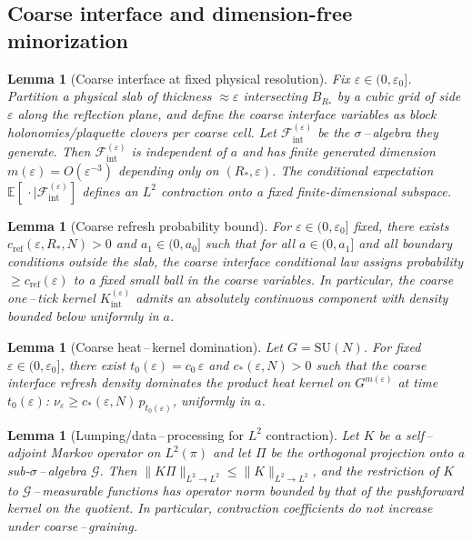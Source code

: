 \documentclass[11pt]{amsart}
\theoremstyle{plain}
\newtheorem{lemma}[theorem]{Lemma}
\theoremstyle{definition}
\theoremstyle{remark}
\begin{document}
\subsection*{Coarse interface and dimension-free minorization}

\begin{lemma}[Coarse interface at fixed physical resolution]\label{lem:coarse-interface-construction}
Fix $\varepsilon\in(0,\varepsilon_0]$. Partition a physical slab of thickness $\approx \varepsilon$ intersecting $B_{R_*}$ by a cubic grid of side $\varepsilon$ along the reflection plane, and define the coarse interface variables as block holonomies/plaquette clovers per coarse cell. Let $\mathcal F_{\mathrm{int}}^{(\varepsilon)}$ be the $\sigma$\,–\,algebra they generate. Then $\mathcal F_{\mathrm{int}}^{(\varepsilon)}$ is independent of $a$ and has finite generated dimension $m(\varepsilon)=O(\varepsilon^{-3})$ depending only on $(R_*,\varepsilon)$. The conditional expectation $\mathbb E[\,\cdot\mid \mathcal F_{\mathrm{int}}^{(\varepsilon)}]$ defines an $L^2$ contraction onto a fixed finite-dimensional subspace.
\end{lemma}

\begin{lemma}[Coarse refresh probability bound]\label{lem:coarse-refresh}
For $\varepsilon\in(0,\varepsilon_0]$ fixed, there exists $c_{\mathrm{ref}}(\varepsilon,R_*,N)>0$ and $a_1\in(0,a_0]$ such that for all $a\in(0,a_1]$ and all boundary conditions outside the slab, the coarse interface conditional law assigns probability $\ge c_{\mathrm{ref}}(\varepsilon)$ to a fixed small ball in the coarse variables. In particular, the coarse one\,–\,tick kernel $K_{\mathrm{int}}^{(\varepsilon)}$ admits an absolutely continuous component with density bounded below uniformly in $a$.
\end{lemma}

\begin{lemma}[Coarse heat\,–\,kernel domination]\label{lem:coarse-hk-domination}
Let $G=\mathrm{SU}(N)$. For fixed $\varepsilon\in(0,\varepsilon_0]$, there exist $t_0(\varepsilon)=c_0\,\varepsilon$ and $c_*(\varepsilon,N)>0$ such that the coarse interface refresh density dominates the product heat kernel on $G^{m(\varepsilon)}$ at time $t_0(\varepsilon)$: $\nu_{\varepsilon}\ge c_*(\varepsilon,N)\, p_{t_0(\varepsilon)}$, uniformly in $a$.
\end{lemma}

\begin{lemma}[Lumping/data\,–\,processing for $L^2$ contraction]\label{lem:lumping}
Let $K$ be a self\,–\,adjoint Markov operator on $L^2(\pi)$ and let $\Pi$ be the orthogonal projection onto a sub-$\sigma$\,–\,algebra $\mathcal G$. Then $\| K\Pi\|_{L^2\to L^2} \le \|K\|_{L^2\to L^2}$, and the restriction of $K$ to $\mathcal G$\,–\,measurable functions has operator norm bounded by that of the pushforward kernel on the quotient. In particular, contraction coefficients do not increase under coarse\,–\,graining.
\end{lemma}
\end{document}
